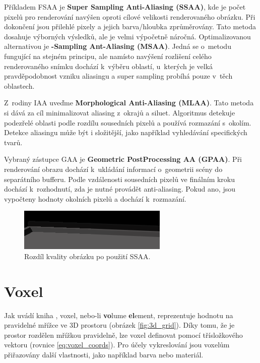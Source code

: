 Příkladem FSAA je \textbf{Super Sampling Anti-Aliasing (SSAA)}, kde je počet pixelů pro renderování navýšen oproti cílové velikosti renderovaného obrázku. Při dokončení jsou přilehlé pixely a jejich barva/hloubka zprůměrovány. Tato metoda dosahuje výborných výsledků, ale je velmi výpočetně náročná. Optimalizovanou alternativou je \textbf{-Sampling Ant-Aliasing (MSAA)}. Jedná se o~metodu fungující na stejném principu, ale namísto navýšení rozlišení celého renderovaného snímku dochází k~výběru oblastí, u~kterých je velká pravděpodobnost vzniku aliasingu a super sampling probíhá pouze v~těch oblastech.

Z~rodiny IAA uveďme\textbf{ Morphological Anti-Aliasing (MLAA)}. Tato metoda si dává za cíl minimalizovat aliasing z~okrajů a siluet. Algoritmus detekuje podezřelé oblasti podle rozdílu sousedních pixelů a používá rozmazání s~okolím. Detekce aliasingu může být i složitější, jako například vyhledávání specifických tvarů.


Vybraný zástupce GAA je \textbf{Geometric PostProcessing AA (GPAA)}. Při renderování obrazu dochází k~ukládání informací o~geometrii scény do separátního bufferu. Podle vzdálenosti sousedních pixelů ve finálním kroku dochází k~rozhodnutí, zda je nutné provádět anti-aliasing. Pokud ano, jsou vypočteny hodnoty okolních pixelů a dochází k~rozmazání.

\begin{figure}[H]
	\centering
	\includegraphics[scale=3]{obrazky-figures/ssaa_diff.png}
	\caption{Rozdíl kvality obrázku po použití SSAA.}
	\label{fig:aliasing}
\end{figure}




\section{Voxel} \label{voxels}
Jak uvádí kniha \cite{gfx_principles_practice}, voxel, nebo-li \textbf{vo}lume \textbf{el}ement, reprezentuje hodnotu na pravidelné mřížce ve 3D prostoru (obrázek \ref{fig:3d_grid}). Díky tomu, že je prostor rozdělen mřížkou pravidelně, lze voxel definovat pomocí třísložkového vektoru (rovnice \ref{eq:voxel_coords}). Pro účely vykreslování jsou voxelům přiřazovány další vlastnosti, jako například barva nebo materiál.

